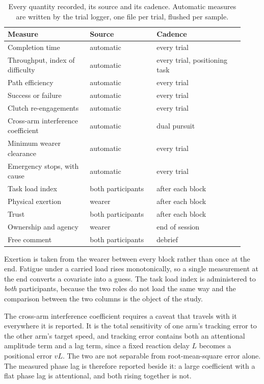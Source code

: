 \begin{table}[htbp]
  \centering
  \caption[Measures]{Every quantity recorded, its source and its cadence.
  Automatic measures are written by the trial logger, one file per trial,
  flushed per sample.}
  \label{tab:measures}
  \begin{tabular}{@{}p{0.32\linewidth}p{0.26\linewidth}p{0.34\linewidth}@{}}
    \toprule
    Measure & Source & Cadence \\
    \midrule
    Completion time & automatic & every trial \\
    Throughput, index of difficulty & automatic & every trial, positioning
      task \\
    Path efficiency & automatic & every trial \\
    Success or failure & automatic & every trial \\
    Clutch re-engagements & automatic & every trial \\
    Cross-arm interference coefficient & automatic & dual pursuit \\
    Minimum wearer clearance & automatic & every trial \\
    Emergency stops, with cause & automatic & every trial \\
    Task load index~\cite{hart1988nasatlx} & both participants & after each
      block \\
    Physical exertion~\cite{borg1982perceived} & wearer & after each block \\
    Trust & both participants & after each block \\
    Ownership and agency~\cite{longo2008embodiment} & wearer & end of session \\
    Free comment & both participants & debrief \\
    \bottomrule
  \end{tabular}
\end{table}

Exertion is taken from the wearer between every block rather than once at the
end. Fatigue under a carried load rises monotonically, so a single measurement
at the end converts a covariate into a guess. The task load index is
administered to \emph{both} participants, because the two roles do not load
the same way and the comparison between the two columns is the object of the
study.

The cross-arm interference coefficient requires a caveat that travels with it
everywhere it is reported. It is the total sensitivity of one arm's tracking
error to the other arm's target speed, and tracking error contains both an
attentional amplitude term and a lag term, since a fixed reaction delay $L$
becomes a positional error $vL$. The two are not separable from root-mean-square
error alone. The measured phase lag is therefore reported beside it: a large
coefficient with a flat phase lag is attentional, and both rising together is
not.

